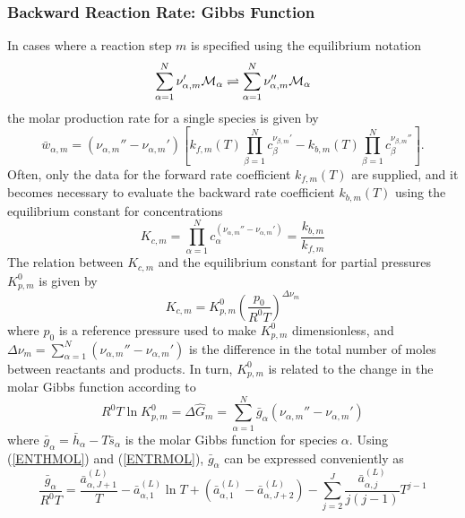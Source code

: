 \documentclass[dvips]{article}
\begin{document}
\subsubsection{Backward Reaction Rate: Gibbs Function}
In cases where a reaction step $m$ is specified using the equilibrium
notation
\begin{equation}
\sum_{\alpha=1}^{N}\nu_{\alpha,m}'{\cal M}_{\alpha} \rightleftharpoons
\sum_{\alpha=1}^{N}\nu_{\alpha,m}''{\cal M}_{\alpha}
\end{equation}
the molar production rate for a single species is given by
\begin{equation}
\bar{w}_{\alpha,m} = 
\left(\nu_{\alpha,m}''-\nu_{\alpha,m}'\right)
\left[
 k_{f,m}(T) \prod_{\beta=1}^{N}c_{\beta}^{\nu_{\beta,m}'}
-k_{b,m}(T) \prod_{\beta=1}^{N}c_{\beta}^{\nu_{\beta,m}''}
\right].
\label{BACKSTEP}
\end{equation}
Often, only the data for the forward rate coefficient $k_{f,m}(T)$ are supplied,
and it becomes necessary to evaluate the backward rate coefficient
$k_{b,m}(T)$ using the equilibrium constant for concentrations
\begin{equation} 
K_{c,m} =
\prod_{\alpha=1}^{N}c_{\alpha}^{(\nu_{\alpha,m}''-\nu_{\alpha,m}')}
= \frac{k_{b,m}}{k_{f,m}} 
\label{KCDEF}
\end{equation} 
The relation between $K_{c,m}$ and the equilibrium constant for partial
pressures $K_{p,m}^{0}$ is given by
\begin{equation}
K_{c,m} = K_{p,m}^{0}\left(\frac{p_{0}}{R^{0}T}\right)^{\Delta \nu_{m}}
\label{KPKC}
\end{equation}
where $p_{0}$ is a reference pressure used to make $K_{p,m}^{0}$ dimensionless,
and $\Delta \nu_{m} = \sum_{\alpha=1}^{N}(\nu_{\alpha,m}''-\nu_{\alpha,m}')$
is the difference in the total number of moles between reactants and
products.  In turn, $K_{p,m}^{0}$ is related to the change in the molar Gibbs
function according to
\begin{equation}
R^{0}T\ln{K_{p,m}^{0}} = \Delta\hat{G}_{m} =
\sum_{\alpha=1}^{N}\bar{g}_{\alpha}(\nu_{\alpha,m}''-\nu_{\alpha,m}')
\label{KPGIBBS}
\end{equation}
where $\bar{g}_{\alpha}=\bar{h}_{\alpha}-T\bar{s}_{\alpha}$ is the molar
Gibbs function for species $\alpha$.  Using (\ref{ENTHMOL}) and (\ref{ENTRMOL}),
$\bar{g}_{\alpha}$ can be expressed conveniently as
\begin{equation}
\frac{\bar{g}_{\alpha}}{R^{0}T} = \frac{\bar{a}_{\alpha,J+1}^{(L)}}{T}
- \bar{a}_{\alpha,1}^{(L)}\ln{T} 
+ (\bar{a}_{\alpha,1}^{(L)} - \bar{a}_{\alpha,J+2}^{(L)})
- \sum_{j=2}^{J} \frac{\bar{a}_{\alpha,j}^{(L)}}{j(j-1)}T^{j-1}
\label{GIBBMOL}
\end{equation}
\end{document}
